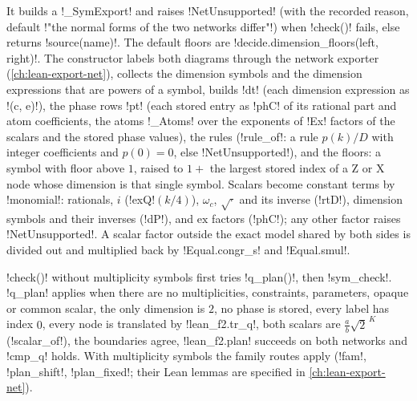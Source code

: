 It builds a \py!_SymExport! and raises \py!NetUnsupported! (with the recorded reason, default \py!"the normal forms of the two networks differ"!) when \py!check()! fails, else returns \py!source(name)!. The default floors are \py!decide.dimension_floors(left, right)!. The constructor labels both diagrams through the network exporter (\cref{ch:lean-export-net}), collects the dimension symbols and the dimension expressions that are powers of a symbol, builds \py!dt! (each dimension expression as \py!(c, e)!), the phase rows \py!pt! (each stored entry as \lean!phC! of its rational part and atom coefficients, the atoms \py!_Atoms! over the exponents of \py!Ex! factors of the scalars and the stored phase values), the rules (\py!rule_of!: a rule $p(k)/D$ with integer coefficients and $p(0)=0$, else \py!NetUnsupported!), and the floors: a symbol with floor above $1$, raised to $1+$ the largest stored index of a Z or X node whose dimension is that single symbol. Scalars become constant terms by \py!monomial!: rationals, $i$ (\lean!exQ!$(k/4)$), $\omega_c$, $\sqrt{\cdot}$ and its inverse (\lean!rtD!), dimension symbols and their inverses (\lean!dP!), and $\mathrm{ex}$ factors (\lean!phC!); any other factor raises \py!NetUnsupported!. A scalar factor outside the exact model shared by both sides is divided out and multiplied back by \lean!Equal.congr_s! and \lean!Equal.smul!.

\py!check()! without multiplicity symbols first tries \py!q_plan()!, then \py!sym_check!. \py!q_plan! applies when there are no multiplicities, constraints, parameters, opaque or common scalar, the only dimension is $2$, no phase is stored, every label has index $0$, every node is translated by \py!lean_f2.tr_q!, both scalars are $\frac ab\sqrt2^{\,K}$ (\py!scalar_of!), the boundaries agree, \py!lean_f2.plan! succeeds on both networks and \py!cmp_q! holds. With multiplicity symbols the family routes apply (\py!fam!, \py!plan_shift!, \py!plan_fixed!; their Lean lemmas are specified in \cref{ch:lean-export-net}).

